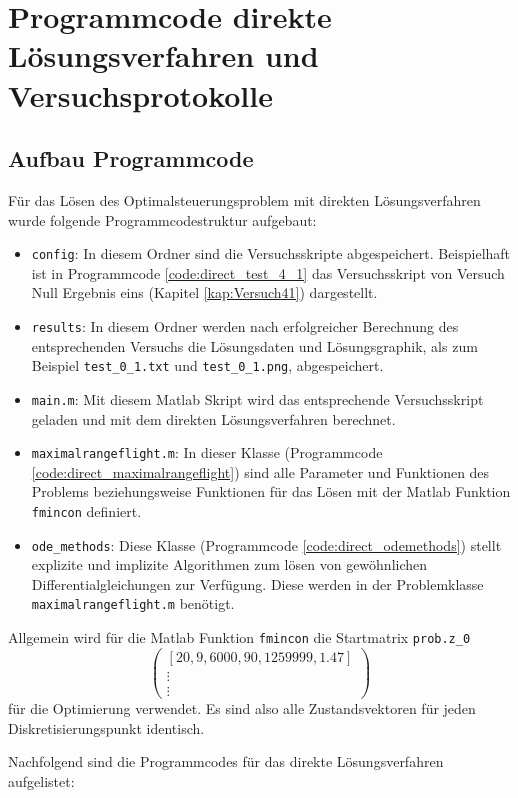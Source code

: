 \chapter{Programmcode direkte Lösungsverfahren und Versuchsprotokolle}\label{Anhang:DirektV}

\section{Aufbau Programmcode}
Für das Lösen des Optimalsteuerungsproblem mit direkten Lösungsverfahren wurde folgende Programmcodestruktur aufgebaut:
\begin{itemize}
\item \texttt{config}: In diesem Ordner sind die Versuchsskripte abgespeichert. Beispielhaft ist in Programmcode \ref{code:direct_test_4_1} das Versuchsskript von Versuch Null Ergebnis eins (Kapitel \ref{kap:Versuch41}) dargestellt.
%
\item \texttt{results}: In diesem Ordner werden nach erfolgreicher Berechnung des entsprechenden Versuchs die Lösungsdaten und Lösungsgraphik, als zum Beispiel \texttt{test\_0\_1.txt} und \texttt{test\_0\_1.png}, abgespeichert.
\item \texttt{main.m}: Mit diesem Matlab Skript wird das entsprechende Versuchsskript geladen und mit dem direkten Lösungsverfahren berechnet.
%
\item \texttt{maximalrangeflight.m}: In dieser Klasse (Programmcode \ref{code:direct_maximalrangeflight}) sind alle Parameter und Funktionen des Problems beziehungsweise Funktionen für das Lösen mit der Matlab Funktion \texttt{fmincon} definiert. 
%
\item \texttt{ode\_methods}: Diese Klasse (Programmcode \ref{code:direct_odemethods}) stellt explizite und implizite Algorithmen zum lösen von gewöhnlichen Differentialgleichungen zur Verfügung. Diese werden in der Problemklasse \texttt{maximalrangeflight.m} benötigt.
\end{itemize}

Allgemein wird für die Matlab Funktion \verb|fmincon| die Startmatrix  \verb|prob.z_0| 
\[\begin{pmatrix}
[20,9,6000,90,1259999,1.47] \\ 
\vdots \\ 
\vdots
\end{pmatrix}\]
für die Optimierung verwendet. Es sind also alle Zustandsvektoren für jeden Diskretisierungspunkt identisch.

Nachfolgend sind die Programmcodes für das direkte Lösungsverfahren aufgelistet:

